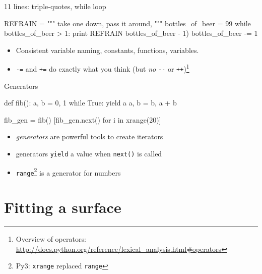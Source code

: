 \documentclass[xetex,10pt]{beamer}
\def\pythoni{\lstinline[language=pythontim]}
\def\spacer{\vspace*{1em}}
\newcommand{\pypypy}[1]{\footnote[frame]{Py3: #1}}
\begin{document}
\begin{frame}[fragile]{11 lines: triple-quotes, while loop }
	\begin{python}
REFRAIN = """
take one down, pass it around,
"""
bottles_of_beer = 99
while bottles_of_beer > 1:
    print REFRAIN %
        bottles_of_beer - 1)
    bottles_of_beer -= 1
\end{python}
	\spacer
	\pause
	\begin{itemize}
		\item Consistent variable naming, constants, functions, variables.
		\pause
		\item \pythoni{-=} and \pythoni{+=} do exactly what you think (but \emph{no} \pythoni{--} or \pythoni{++})\footnote[frame]{Overview of operators: \url{http://docs.python.org/reference/lexical_analysis.html\#operators}}
	\end{itemize}
\end{frame}

\begin{frame}[fragile]{Generators}
	\begin{python}
def fib():
    a, b = 0, 1
    while True:
        yield a
        a, b = b, a + b

fib_gen = fib()
[fib_gen.next() for i in xrange(20)]
\end{python}
	\spacer
	\pause
	\begin{itemize}
		\item \emph{generators} are powerful tools to create iterators
		\pause
		\item generators \pythoni{yield} a value when \pythoni{next()} is called
		\pause
		\item \pythoni{range}\pypypy{\pythoni{xrange} replaced \pythoni{range}} is a generator for numbers
	\end{itemize}
\end{frame}

\section{Fitting a surface}
\end{document}
